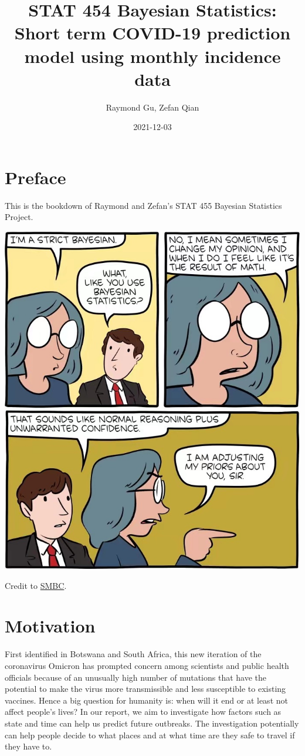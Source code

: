 \documentclass[
]{book}
\title{STAT 454 Bayesian Statistics: Short term COVID-19 prediction model using monthly incidence data}
\author{Raymond Gu, Zefan Qian}
\date{2021-12-03}
\begin{document}
\maketitle

{
\setcounter{tocdepth}{1}
\tableofcontents
}
\hypertarget{preface}{%
\chapter{Preface}\label{preface}}

This is the bookdown of Raymond and Zefan's STAT 455 Bayesian Statistics Project.

\includegraphics{preface_comic.jpg}

Credit to \href{smbc-comics.com}{SMBC}.

\hypertarget{intro}{%
\chapter{Motivation}\label{intro}}

First identified in Botswana and South Africa, this new iteration of the coronavirus Omicron has prompted concern among scientists and public health officials because of an unusually high number of mutations that have the potential to make the virus more transmissible and less susceptible to existing vaccines. Hence a big question for humanity is: when will it end or at least not affect people's lives? In our report, we aim to investigate how factors such as state and time can help us predict future outbreaks. The investigation potentially can help people decide to what places and at what time are they safe to travel if they have to.
\end{document}

